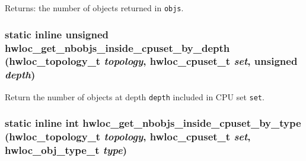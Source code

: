 \begin{Desc}
\item[Returns:]the number of objects returned in {\tt objs}. \end{Desc}
\hypertarget{group__hwlocality__helper__find__inside_gce5af1ea003c8269566b6726fade7b32}{
\subsubsection[{hwloc\_\-get\_\-nbobjs\_\-inside\_\-cpuset\_\-by\_\-depth}]{\setlength{\rightskip}{0pt plus 5cm}static inline unsigned hwloc\_\-get\_\-nbobjs\_\-inside\_\-cpuset\_\-by\_\-depth ({\bf hwloc\_\-topology\_\-t} {\em topology}, \/  {\bf hwloc\_\-cpuset\_\-t} {\em set}, \/  unsigned {\em depth})}}
\label{group__hwlocality__helper__find__inside_gce5af1ea003c8269566b6726fade7b32}


Return the number of objects at depth {\tt depth} included in CPU set {\tt set}. 

\hypertarget{group__hwlocality__helper__find__inside_g7e44cec58c6bdb681400a52d007d2597}{
\subsubsection[{hwloc\_\-get\_\-nbobjs\_\-inside\_\-cpuset\_\-by\_\-type}]{\setlength{\rightskip}{0pt plus 5cm}static inline int hwloc\_\-get\_\-nbobjs\_\-inside\_\-cpuset\_\-by\_\-type ({\bf hwloc\_\-topology\_\-t} {\em topology}, \/  {\bf hwloc\_\-cpuset\_\-t} {\em set}, \/  {\bf hwloc\_\-obj\_\-type\_\-t} {\em type})}}
\label{group__hwlocality__helper__find__inside_g7e44cec58c6bdb681400a52d007d2597}


